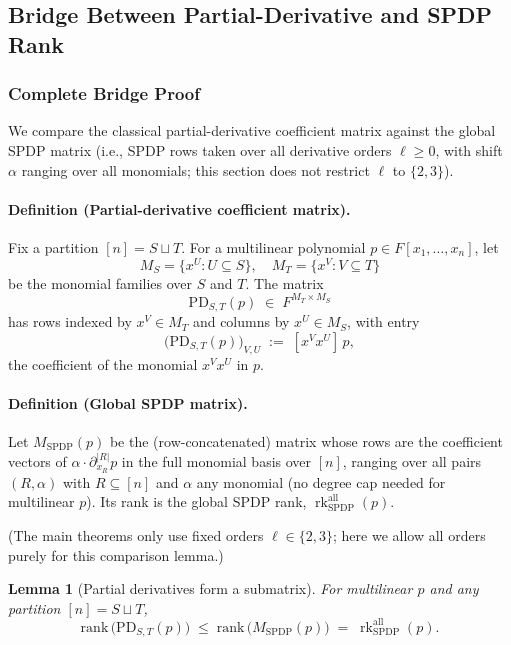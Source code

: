 \documentclass[12pt]{article}
\newtheorem{lemma}[theorem]{Lemma}
\theoremstyle{definition}
\theoremstyle{definition}
\theoremstyle{remark}
\theoremstyle{remark}
\begin{document}
\subsection{Bridge Between Partial-Derivative and SPDP Rank}

\subsubsection{Complete Bridge Proof}

We compare the classical partial-derivative coefficient matrix against the global SPDP matrix (i.e., SPDP rows taken over all derivative orders $\ell \ge 0$, with shift $\alpha$ ranging over all monomials; this section does not restrict $\ell$ to $\{2,3\}$).

\paragraph{Definition (Partial-derivative coefficient matrix).}
Fix a partition $[n] = S \sqcup T$. For a multilinear polynomial $p \in F[x_1, \ldots, x_n]$, let
\[
M_S = \{x^U : U \subseteq S\}, \quad M_T = \{x^V : V \subseteq T\}
\]
be the monomial families over $S$ and $T$. The matrix
\[
\mathrm{PD}_{S,T}(p) \;\in\; F^{M_T \times M_S}
\]
has rows indexed by $x^V \in M_T$ and columns by $x^U \in M_S$, with entry
\[
\bigl(\mathrm{PD}_{S,T}(p)\bigr)_{V,U} \;:=\; [x^V x^U]\, p,
\]
the coefficient of the monomial $x^V x^U$ in $p$.

\paragraph{Definition (Global SPDP matrix).}
Let $M_{\mathrm{SPDP}}(p)$ be the (row-concatenated) matrix whose rows are the coefficient vectors of $\alpha \cdot \partial_{x_R}^{|R|} p$ in the full monomial basis over $[n]$, ranging over all pairs $(R, \alpha)$ with $R \subseteq [n]$ and $\alpha$ any monomial (no degree cap needed for multilinear $p$). Its rank is the global SPDP rank, $\operatorname{rk}_{\mathrm{SPDP}}^{\mathrm{all}}(p)$.

(The main theorems only use fixed orders $\ell \in \{2,3\}$; here we allow all orders purely for this comparison lemma.)

\begin{lemma}[Partial derivatives form a submatrix]\label{lem:bridge}
For multilinear $p$ and any partition $[n] = S \sqcup T$,
\[
\mathrm{rank}\,\bigl(\mathrm{PD}_{S,T}(p)\bigr) \;\le\; \mathrm{rank}\,\bigl(M_{\mathrm{SPDP}}(p)\bigr) \;=\; \operatorname{rk}_{\mathrm{SPDP}}^{\mathrm{all}}(p).
\]
\end{lemma}
\end{document}
